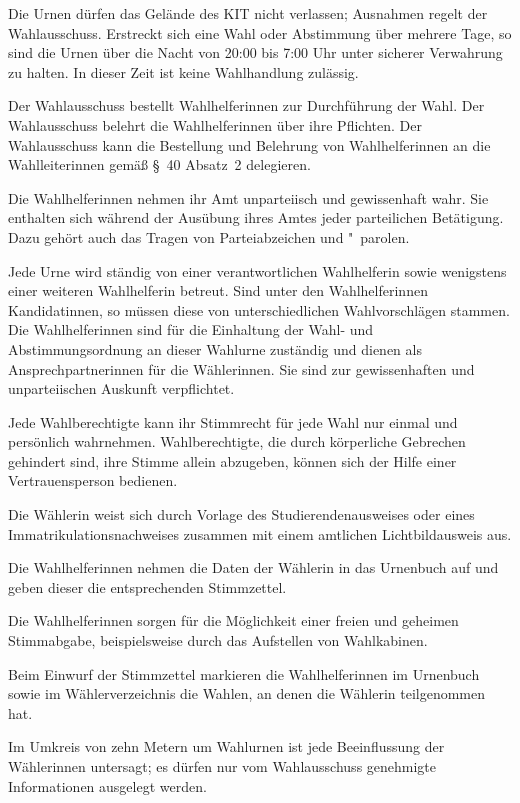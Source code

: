 \begin{jurdoc}
Die Urnen dürfen das Gelände des KIT nicht verlassen; Ausnahmen regelt der Wahlausschuss. Erstreckt sich eine Wahl oder Abstimmung über mehrere Tage, so sind die Urnen über die Nacht von 20:00 bis 7:00 Uhr unter sicherer Verwahrung zu halten. In dieser Zeit ist keine Wahlhandlung zulässig.

\label{wahl:wahlhelferinnen}
Der Wahlausschuss bestellt Wahlhelferinnen zur Durchführung der Wahl. Der Wahlausschuss belehrt die Wahlhelferinnen über ihre Pflichten. Der Wahlausschuss kann die Bestellung und Belehrung von Wahlhelferinnen an die Wahlleiterinnen gemäß §~40 Absatz~2 delegieren.

Die Wahlhelferinnen nehmen ihr Amt unparteiisch und gewissenhaft wahr. Sie enthalten sich während der Ausübung ihres Amtes jeder parteilichen Betätigung. Dazu gehört auch das Tragen von Parteiabzeichen und "~parolen.

\label{wahl:wahlhandlung}
Jede Urne wird ständig von einer verantwortlichen Wahlhelferin sowie wenigstens einer weiteren Wahlhelferin betreut. Sind unter den Wahlhelferinnen Kandidatinnen, so müssen diese von unterschiedlichen Wahlvorschlägen stammen. Die Wahlhelferinnen sind für die Einhaltung der Wahl- und Abstimmungsordnung an dieser Wahlurne zuständig und dienen als Ansprechpartnerinnen für die Wählerinnen. Sie sind zur gewissenhaften und unparteiischen Auskunft verpflichtet.

Jede Wahlberechtigte kann ihr Stimmrecht für jede Wahl nur einmal und persönlich wahrnehmen. Wahlberechtigte, die durch körperliche Gebrechen gehindert sind, ihre Stimme allein abzugeben, können sich der Hilfe einer Vertrauensperson bedienen.

Die Wählerin weist sich durch Vorlage des Studierendenausweises oder  eines Immatrikulationsnachweises zusammen mit einem amtlichen Lichtbildausweis aus. \label{wahl:wahlhandlung:nachweis}

Die Wahlhelferinnen nehmen die Daten der Wählerin in das Urnenbuch auf und geben dieser die entsprechenden Stimmzettel.

Die Wahlhelferinnen sorgen für die Möglichkeit einer freien und geheimen Stimmabgabe, beispielsweise durch das Aufstellen von Wahlkabinen.

Beim Einwurf der Stimmzettel markieren die Wahlhelferinnen im Urnenbuch sowie im Wählerverzeichnis die Wahlen, an denen die Wählerin teilgenommen hat.

Im Umkreis von zehn Metern um Wahlurnen ist jede Beeinflussung der Wählerinnen untersagt; es dürfen nur vom Wahlausschuss genehmigte Informationen ausgelegt werden.


\end{jurdoc}
